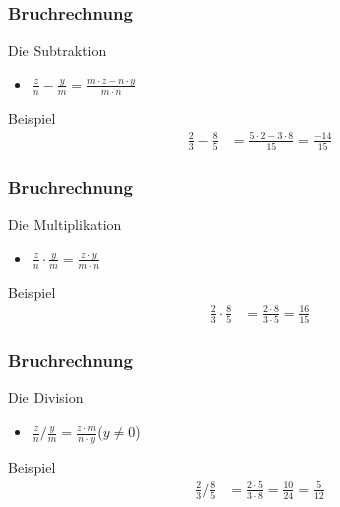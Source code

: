 \documentclass{beamer}
\begin{document}
\begin{frame}\frametitle{Bruchrechnung}
	\begin{block}{Die Subtraktion}
		\begin{itemize}
			\item  $\displaystyle\frac{z}{n}-\frac{y}{m}=\frac{m\cdot z-n\cdot y}{m\cdot n}	$
		\end{itemize}
	\end{block}
	\begin{block}{Beispiel}
		\begin{align*}
			\frac{2}{3}-\frac{8}{5}&=\frac{5\cdot 2-3\cdot 8}{15}=\frac{-14}{15}
		\end{align*}
	\end{block}
\end{frame}

\begin{frame}\frametitle{Bruchrechnung}
	\begin{block}{Die Multiplikation}
		\begin{itemize}
			\item  $\displaystyle\frac{z}{n}\cdot\frac{y}{m}=\frac{z\cdot y}{m\cdot n}$
		\end{itemize}
	\end{block}
\begin{block}{Beispiel}
		\begin{align*}
			\frac{2}{3}\cdot\frac{8}{5}&=\frac{2\cdot 8}{3\cdot 5}=\frac{16}{15}
		\end{align*}
	\end{block}
\end{frame}

\begin{frame}\frametitle{Bruchrechnung}
	\begin{block}{Die Division}
		\begin{itemize}
			\item  $\displaystyle\frac{z}{n}/\frac{y}{m}=\frac{z\cdot m}{n\cdot y}$\hfill($y\neq0$)
		\end{itemize}
	\end{block}
\begin{block}{Beispiel}
		\begin{align*}
			\frac{2}{3}/\frac{8}{5}&=\frac{2\cdot 5}{3\cdot 8}=\frac{10}{24}=\frac{5}{12}
		\end{align*}
	\end{block}
\end{frame}
\end{document}
